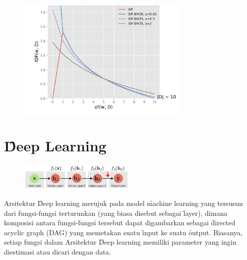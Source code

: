     \begin{figure}
        \centering
        \includegraphics[width=0.75\textwidth]{assets/pics/smoothed-idf.png}
        \label{fig:smoothed-idf}
    \end{figure}


\section{\f{Deep Learning}}
    \begin{figure}
        \centering
        \includegraphics[width=0.50\textwidth]{assets/pics/dag-dl.png}
        \label{fig:deep-learning-FFN-dag}
    \end{figure}
    Arsitektur \f{Deep learning} merujuk pada model \f{machine learning} yang tersusun dari fungsi-fungsi terturunkan (yang biasa disebut sebagai \f{layer}), dimana komposisi antara fungsi-fungsi tersebut dapat digambarkan sebagai \f{directed acyclic graph} (DAG) yang memetakan suatu \f{input} ke suatu \f{output}. Biasanya, setiap fungsi dalam Arsitektur \f{Deep learning} memiliki parameter yang ingin diestimasi atau dicari dengan data.
    
